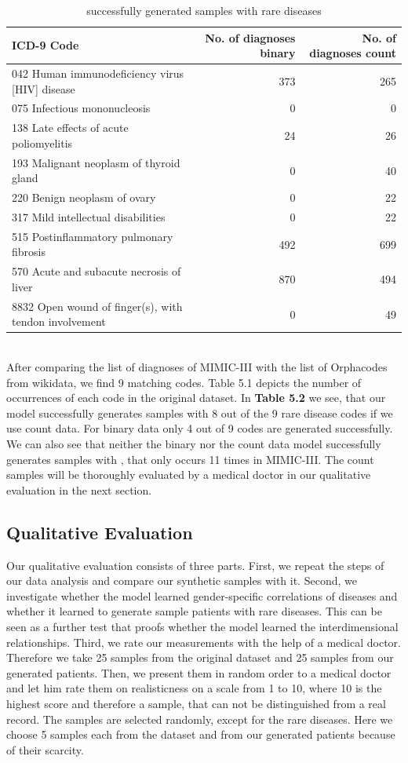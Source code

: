 \documentclass[11pt, a4paper]{book}
\begin{document}
\begin{table}
\begin{tabularx}{\textwidth}{X|r|r}
ICD-9 Code & No. of diagnoses binary & No. of diagnoses count\\
\hline
042 Human immunodeficiency virus [HIV] disease	& 373 & 265\\
075 Infectious mononucleosis & 0 & 0\\
138 Late effects of acute poliomyelitis & 24  & 26\\
193 Malignant neoplasm of thyroid gland & 0 & 40\\
220 Benign neoplasm of ovary & 0 & 22\\
317 Mild intellectual disabilities & 0 & 22\\
515 Postinflammatory pulmonary fibrosis & 492 & 699\\
570 Acute and subacute necrosis of liver & 870 & 494\\
8832 Open wound of finger(s), with tendon involvement & 0 & 49\\ 
\end{tabularx}
\caption{\label{tab:rare-generated}successfully generated samples with rare diseases}
\end{table}
\\
After comparing the list of diagnoses of MIMIC-III with the list of Orphacodes from wikidata, we find 9 matching codes. Table 5.1 depicts the number of occurrences of each code in the original dataset. In \textbf{Table 5.2} we see, that our model successfully generates samples with 8 out of the 9 rare disease codes if we use count data. For binary data only 4 out of 9 codes are generated successfully. We can also see that neither the binary nor the count data model successfully generates samples with , that only occurs 11 times in MIMIC-III. 
The count samples will be thoroughly evaluated by a medical doctor in our qualitative evaluation in the next section.


\subsection{Qualitative Evaluation}
Our qualitative evaluation consists of three parts. First, we repeat the steps of our data analysis and compare our synthetic samples with it. Second, we investigate whether the model learned gender-specific correlations of diseases and whether it learned to generate sample patients with rare diseases. This can be seen as a further test that proofs whether the model learned the interdimensional relationships. Third, we rate our measurements with the help of a medical doctor. Therefore we take 25 samples from the original dataset and 25 samples from our generated patients. Then, we present them in random order to a medical doctor and let him rate them on realisticness on a scale from 1 to 10, where 10 is the highest score and therefore a sample, that can not be distinguished from a real record.
The samples are selected randomly, except for the rare diseases. Here we choose 5 samples each from the dataset and from our generated patients because of their scarcity.
\end{document}
